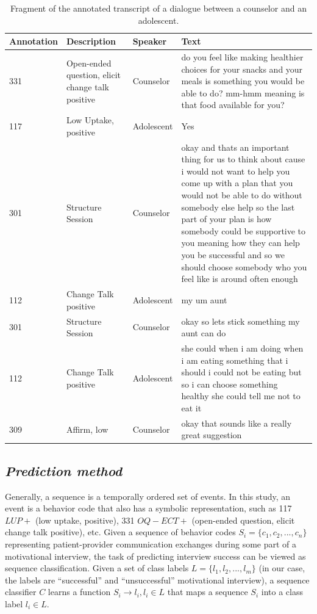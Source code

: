 \documentclass{amia_summit_2018}
\begin{document}
\begin{table}[h]
\caption{Fragment of the annotated transcript of a dialogue between a counselor and an adolescent.}    
\label{tab:anno_examp}
\centering
\begin{tabular}{|l|p{3.6cm}|l|p{8cm}|}
\hline
Annotation  & Description & Speaker & Text \\\hline
331 &	Open-ended question, elicit change talk positive &	Counselor &	do you feel like making healthier choices for your snacks and your meals is something you would be able to do? mm-hmm meaning is that food available for you? \\\hline
117 &	Low Uptake, positive	& Adolescent &	Yes \\\hline
301 &	Structure Session	& Counselor &	okay and thats an important thing for us to think about cause i would not want to help you come up with a plan that you would not be able to do without somebody else help so the last part of your plan is how somebody could be supportive to you meaning how they can help you be successful and so we should choose somebody who you feel like is around often enough \\\hline
112 &	Change Talk positive	& Adolescent &	my um aunt \\\hline
301 &	Structure Session	& Counselor &	okay so lets stick something my aunt can do \\\hline
112 &	Change Talk positive &	Adolescent &	she could when i am doing when i am eating something that i should i could not be eating but so i can choose something healthy she could tell me not to eat it \\\hline
309 &	Affirm, low &	Counselor &	okay that sounds like a really great suggestion \\\hline
\end{tabular}
\end{table}  

\subsection*{\textit{Prediction method}}
Generally, a sequence is a temporally ordered set of events. In this study, an event is a behavior code that also has a symbolic representation, such as 117 $LUP+$ (low uptake, positive), 331 $OQ-ECT+$ (open-ended question, elicit change talk positive), etc.  Given a sequence of behavior codes $S_i = \{c_1, c_2,...,c_n\}$ representing patient-provider communication exchanges during some part of a motivational interview, the task of predicting interview success can be viewed as sequence classification. Given a set of class labels $L = \{l_1, l_2,...,l_m\}$ (in our case, the labels are ``successful'' and ``unsuccessful'' motivational interview), a sequence classifier $C$ learns a function $S_i \to l_i, l_i \in L$ that maps a sequence $S_i$ into a class label $l_i \in L$.
\end{document}
